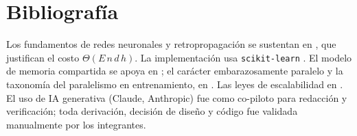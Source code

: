 \documentclass[11pt,a4paper]{article}
\begin{document}
\section{Bibliografía}

Los fundamentos de redes neuronales y retropropagación se sustentan en
\cite{rumelhart1986,lecun2015,goodfellow2016}, que justifican el costo
$\Theta(E\,n\,d\,h)$. La implementación usa \texttt{scikit-learn}
\cite{pedregosa2011,buitinck2013}. El modelo de memoria compartida se apoya en
\cite{dagum1998,chapman2007}; el carácter embarazosamente paralelo y la
taxonomía del paralelismo en entrenamiento, en \cite{bennun2019,farias2023}. Las
leyes de escalabilidad en \cite{amdahl1967,gustafson1988,hill2008}. El uso de IA
generativa (Claude, Anthropic) fue como co-piloto para redacción y verificación;
toda derivación, decisión de diseño y código fue validada manualmente por los
integrantes.
\end{document}
